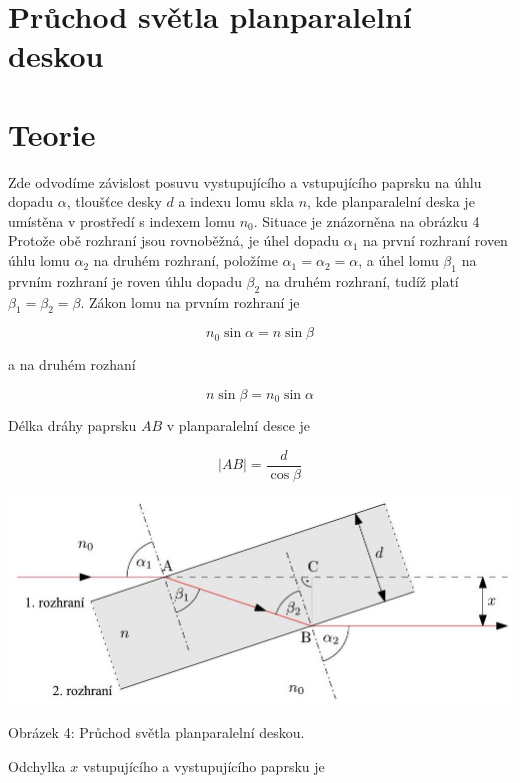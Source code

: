 \documentclass[czech,11pt,a4paper]{article}
\begin{document}
\begin{multicols}{2}
		\section*{Průchod světla planparalelní deskou}
		\section*{Teorie}
		Zde odvodíme závislost posuvu vystupujícího a vstupujícího paprsku na úhlu dopadu $\alpha$, tloušťce desky $d$ a indexu lomu skla $n$, kde planparalelní deska je umístěna v prostředí s indexem lomu $n_{0}$. Situace je znázorněna na obrázku 4 Protože obě rozhraní jsou rovnoběžná, je úhel dopadu $\alpha_{1}$ na první rozhraní roven úhlu lomu $\alpha_{2}$ na druhém rozhraní, položíme $\alpha_{1}=\alpha_{2}=\alpha$, a úhel lomu $\beta_{1}$ na prvním rozhraní je roven úhlu dopadu $\beta_{2}$ na druhém rozhraní, tudíž platí $\beta_{1}=\beta_{2}=\beta$. Zákon lomu na prvním rozhraní je
		
		
		\begin{equation}
			n_{0} \sin \alpha=n \sin \beta
		\end{equation}
		
		a na druhém rozhaní
		
		
		\begin{equation}
			n \sin \beta=n_{0} \sin \alpha
		\end{equation}
		
		Délka dráhy paprsku $A B$ v planparalelní desce je
		
		\begin{equation}
			|A B|=\frac{d}{\cos \beta}
		\end{equation}
		
		\begin{center}
		\includegraphics[max width=0.9\linewidth]{2024_11_19_160a1389244899f42734g-5}
		\end{center}
		
		Obrázek 4: Průchod světla planparalelní deskou.
		
		Odchylka $x$ vstupujícího a vystupujícího paprsku je
		

\end{multicols}
\end{document}

